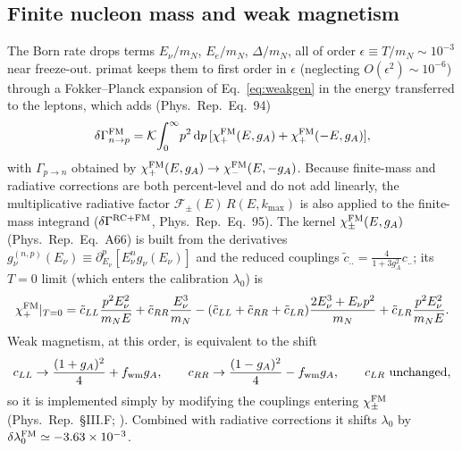 \documentclass[11pt,a4paper]{article}
\newcommand{\dd}{\mathrm{d}}
\newcommand{\PR}{Phys.\ Rep.}
\newcommand{\Gap}{\Delta}
\newcommand{\Kw}{\mathcal{K}}
\newcommand{\cLL}{c_{LL}}
\newcommand{\cRR}{c_{RR}}
\newcommand{\cLR}{c_{LR}}
\begin{document}
\subsection*{Finite nucleon mass and weak magnetism}
The Born rate drops terms $E_\nu/m_N$, $E_e/m_N$, $\Gap/m_N$, all of order
$\epsilon\equiv T/m_N\sim10^{-3}$ near freeze-out. primat keeps them to first
order in $\epsilon$ (neglecting $O(\epsilon^2)\sim10^{-6}$) through a
Fokker--Planck expansion of Eq.~\eqref{eq:weakgen} in the energy transferred to
the leptons, which adds (\PR\ Eq.~94)
\begin{equation}
  \delta\Gamma^{\rm FM}_{n\to p}
   = \Kw\!\int_0^\infty\! p^2\,\dd p\,
     [\chi^{\rm FM}_+(E,g_A)+\chi^{\rm FM}_+(-E,g_A)],
\end{equation}
with $\Gamma_{p\to n}$ obtained by $\chi^{\rm FM}_+(E,g_A)\to\chi^{\rm
FM}_-(E,-g_A)$. Because finite-mass and radiative corrections are both
percent-level and do not add linearly, the multiplicative radiative factor
$\mathcal F_\pm(E)\,R(E,k_{\max})$ is also applied to the finite-mass integrand
($\delta\Gamma^{\rm RC+FM}$, \PR\ Eq.~95). The kernel $\chi^{\rm FM}_\pm(E,g_A)$
(\PR\ Eq.~A66) is built from the derivatives
$g^{(n,p)}_\nu(E_\nu)\equiv\partial_{E_\nu}^p[E_\nu^n g_\nu(E_\nu)]$ and the
reduced couplings $\tilde c_{..}=\tfrac{4}{1+3g_A^2}c_{..}$; its $T=0$ limit
(which enters the calibration $\lambda_0$) is
\begin{equation}
  \chi^{\rm FM}_+|_{T=0} = \tilde\cLL\frac{p^2E_\nu^2}{m_NE}
    + \tilde\cRR\frac{E_\nu^3}{m_N}
    - (\tilde\cLL+\tilde\cRR+\tilde\cLR)\frac{2E_\nu^3+E_\nu p^2}{m_N}
    + \tilde\cLR\frac{p^2E_\nu^2}{m_NE}.
\end{equation}
Weak magnetism, at this order, is equivalent to the shift
\begin{equation}
  \cLL\to\frac{(1+g_A)^2}{4}+f_{\rm wm}g_A, \qquad
  \cRR\to\frac{(1-g_A)^2}{4}-f_{\rm wm}g_A, \qquad
  \cLR \text{ unchanged},
\end{equation}
so it is implemented simply by modifying the couplings entering
$\chi^{\rm FM}_\pm$ (\PR\ \S III.F; \cite{Seckel1993}). Combined with radiative
corrections it shifts $\lambda_0$ by $\delta\lambda_0^{\rm FM}\simeq-3.63\times
10^{-3}$.
\end{document}
